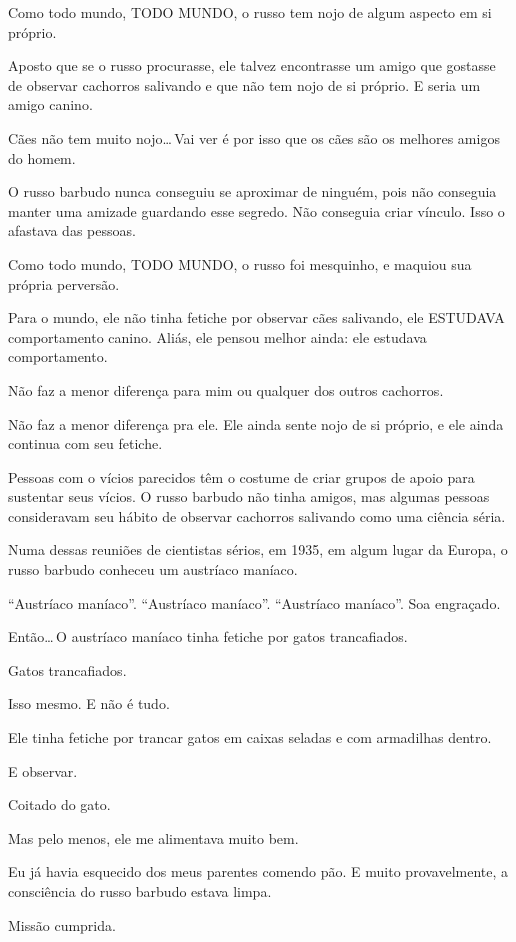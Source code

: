 Como todo mundo, TODO MUNDO, o russo tem nojo de algum aspecto em si próprio.

Aposto que se o russo procurasse, ele talvez encontrasse um amigo que gostasse de observar cachorros salivando e que não tem nojo de si próprio. E seria um amigo canino.

Cães não tem muito nojo\ldots\,Vai ver é por isso que os cães são os melhores amigos do homem.

O russo barbudo nunca conseguiu se aproximar de ninguém, pois não conseguia manter uma amizade guardando esse segredo. Não conseguia criar vínculo. Isso o afastava das pessoas.

Como todo mundo, TODO MUNDO, o russo foi mesquinho, e maquiou sua própria perversão.

Para o mundo, ele não tinha fetiche por observar cães salivando, ele ESTUDAVA comportamento canino. Aliás, ele pensou melhor ainda: ele estudava comportamento.

Não faz a menor diferença para mim ou qualquer dos outros cachorros.

Não faz a menor diferença pra ele. Ele ainda sente nojo de si próprio, e ele ainda continua com seu fetiche.

Pessoas com o vícios parecidos têm o costume de criar grupos de apoio para sustentar seus vícios. O russo barbudo não tinha amigos, mas algumas pessoas consideravam seu hábito de observar cachorros salivando como uma ciência séria.

Numa dessas reuniões de cientistas sérios, em 1935, em algum lugar da Europa, o russo barbudo conheceu um austríaco maníaco.

``Austríaco maníaco''. ``Austríaco maníaco''. ``Austríaco maníaco''. Soa engraçado.

Então\ldots\,O austríaco maníaco tinha fetiche por gatos trancafiados.

Gatos trancafiados.

Isso mesmo. E não é tudo.

Ele tinha fetiche por trancar gatos em caixas seladas e com armadilhas dentro.

E observar.

Coitado do gato.

Mas pelo menos, ele me alimentava muito bem.

Eu já havia esquecido dos meus parentes comendo pão. E muito provavelmente, a consciência do russo barbudo estava limpa.

Missão cumprida.

